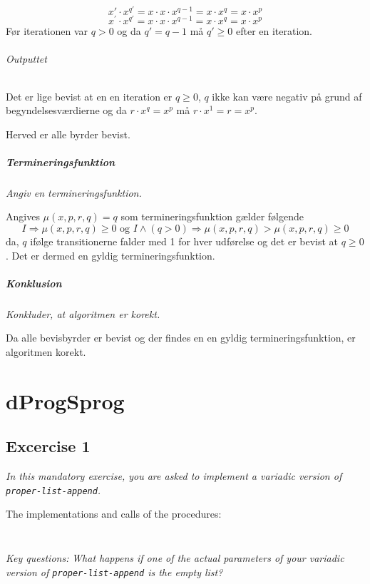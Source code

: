\documentclass[a4paper,final,12pt,oneside,article,table]{memoir}
\begin{document}
\[ x' · x^{q'} = x·x·x^{q-1} = x·x^q = x·x^p \]
\[ x^\prime · x^{q\prime} = x·x·x^{q-1} = x·x^q = x·x^p \] 
Før iterationen var $q>0$ og da $q'=q-1$ må $q' \geq 0$ efter en iteration.
\subparagraph{Outputtet}
Det er lige bevist at en en iteration er $q \geq 0$, $q$ ikke kan være negativ på grund af begyndelsesværdierne og da $r·x^q = x^p$ må $r·x^1 = r = x^p$.

Herved er alle byrder bevist.

\paragraph{Termineringsfunktion}
\textit{Angiv en termineringsfunktion.}

Angives $\mu(x,p,r,q) = q$ som termineringsfunktion gælder følgende
\[I ⇒ \mu(x,p,r,q) \geq 0 \text{ og } I ∧ (q>0) ⇒ \mu(x,p,r,q) > \mu(x,p,r,q) \geq 0 \]
da, $q$ ifølge transitionerne falder med 1 for hver udførelse og det er bevist at $q \geq 0$. Det er dermed en gyldig termineringsfunktion.

\paragraph{Konklusion}
\textit{Konkluder, at algoritmen er korekt.}

Da alle bevisbyrder er bevist og der findes en en gyldig termineringsfunktion, er algoritmen korekt.

\chapter{dProgSprog}

\section*{Excercise 1}
\textit{In this mandatory exercise, you are asked to implement a variadic version of \texttt{proper-list-append}.}

The implementations and calls of the procedures:
\inputminted{scheme}{opg1.ss}
\inputminted{java}{CityImpl.java}
\textit{Key questions:}
\textit{What happens if one of the actual parameters of your variadic version of \texttt{proper-list-append} is the empty list?}
\end{document}
